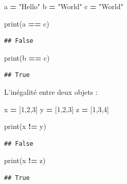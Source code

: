 \documentclass[12pt,]{book}
\newenvironment{Shaded}{\begin{snugshade}}{\end{snugshade}}
\newcommand{\DecValTok}[1]{\textcolor[rgb]{0.00,0.00,0.81}{#1}}
\newcommand{\StringTok}[1]{\textcolor[rgb]{0.31,0.60,0.02}{#1}}
\newcommand{\OperatorTok}[1]{\textcolor[rgb]{0.81,0.36,0.00}{\textbf{#1}}}
\newcommand{\BuiltInTok}[1]{#1}
\newcommand{\NormalTok}[1]{#1}
\numberwithin{equation}{section}
\numberwithin{countremarque}{section}
\begin{document}
\begin{Shaded}
\begin{Highlighting}[]
\NormalTok{a }\OperatorTok{=} \StringTok{"Hello"}
\NormalTok{b }\OperatorTok{=} \StringTok{"World"}
\NormalTok{c }\OperatorTok{=} \StringTok{"World"}

\BuiltInTok{print}\NormalTok{(a }\OperatorTok{==}\NormalTok{ c)}
\end{Highlighting}
\end{Shaded}

\begin{lstlisting}
## False
\end{lstlisting}

\begin{Shaded}
\begin{Highlighting}[]
\BuiltInTok{print}\NormalTok{(b }\OperatorTok{==}\NormalTok{ c)}
\end{Highlighting}
\end{Shaded}

\begin{lstlisting}
## True
\end{lstlisting}

L'inégalité entre deux objets :

\begin{Shaded}
\begin{Highlighting}[]
\NormalTok{x }\OperatorTok{=}\NormalTok{ [}\DecValTok{1}\NormalTok{,}\DecValTok{2}\NormalTok{,}\DecValTok{3}\NormalTok{]}
\NormalTok{y }\OperatorTok{=}\NormalTok{ [}\DecValTok{1}\NormalTok{,}\DecValTok{2}\NormalTok{,}\DecValTok{3}\NormalTok{]}
\NormalTok{z }\OperatorTok{=}\NormalTok{ [}\DecValTok{1}\NormalTok{,}\DecValTok{3}\NormalTok{,}\DecValTok{4}\NormalTok{]}

\BuiltInTok{print}\NormalTok{(x }\OperatorTok{!=}\NormalTok{ y)}
\end{Highlighting}
\end{Shaded}

\begin{lstlisting}
## False
\end{lstlisting}

\begin{Shaded}
\begin{Highlighting}[]
\BuiltInTok{print}\NormalTok{(x }\OperatorTok{!=}\NormalTok{ z)}
\end{Highlighting}
\end{Shaded}

\begin{lstlisting}
## True
\end{lstlisting}
\end{document}
